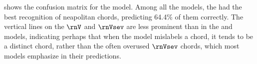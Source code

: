 

 shows the confusion
matrix for the \textcite{micchi2021deep} model. Among all
the models, the \textcite{micchi2021deep} had the best
recognition of \gls{neapolitan} chords, predicting 64.4\% of
them correctly. The vertical lines on the $\rnV$ and
$\rnVsev$ are less prominent than in the
\textcite{chen2021attend} and \textcite{mcleod2021modular}
models, indicating perhaps that when the model mislabels a
chord, it tends to be a distinct chord, rather than the
often overused $\rnVsev$ chords, which most models emphasize
in their predictions.


